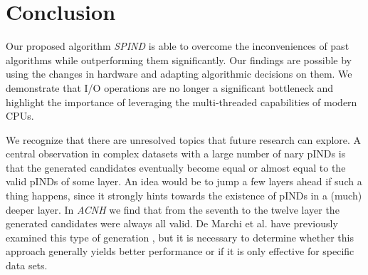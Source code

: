\section{Conclusion}
Our proposed algorithm \textit{SPIND} is able to overcome the inconveniences of past algorithms while outperforming them significantly. Our findings are possible by using the changes in hardware and adapting algorithmic decisions on them. We demonstrate that I/O operations are no longer a significant bottleneck and highlight the importance of leveraging the multi-threaded capabilities of modern CPUs.

We recognize that there are unresolved topics that future research can explore. A central observation in complex datasets with a large number of nary pINDs is that the generated candidates eventually become equal or almost equal to the valid pINDs of some layer. An idea would be to jump a few layers ahead if such a thing happens, since it strongly hints towards the existence of pINDs in a (much) deeper layer. In \textit{ACNH} we find that from the seventh to the twelve layer the generated candidates were always all valid. De Marchi et al. have previously examined this type of generation \cite{de2003zigzag}, but it is necessary to determine whether this approach generally yields better performance or if it is only effective for specific data sets. 

